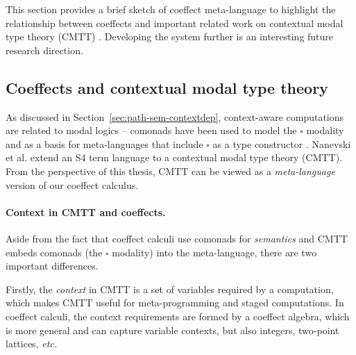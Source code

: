 This section provides a brief sketch of coeffect meta-language to highlight the relationship
between coeffects and important related work on contextual modal type theory (CMTT) \cite{logic-cmtt}.
Developing the system further is an interesting future research direction.


\subsection{Coeffects and contextual modal type theory}

As discussed in Section~\ref{sec:path-sem-contextdep}, context-aware computations are related
to modal logics -- comonads have been used to model the $\square$ modality and as a basis for
meta-languages that include $\square$ as a type constructor
\cite{logic-intuitionistic-modal,logic-modal-reconstruction,logic-intuitionistic-modal,logic-cmtt}.
Nanevski et al. \cite{logic-cmtt} extend an S4 term language to a contextual modal type theory (CMTT).
From the perspective of this thesis, CMTT can be viewed as a \emph{meta-language} version of our
coeffect calculus.

\paragraph{Context in CMTT and coeffects.}
Aside from the fact that coeffect calculi use comonads for \emph{semantics} and CMTT embeds
comonads (the $\square$ modality) into the meta-language, there are two important differences.

Firstly, the \emph{context} in CMTT is a set of variables required by a computation, which
makes CMTT useful for meta-programming and staged computations. In coeffect calculi, the context
requirements are formed by a coeffect algebra, which is more general and can capture
variable contexts, but also integers, two-point lattices, \emph{etc.}

